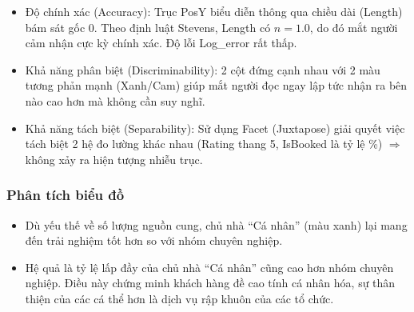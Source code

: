 \begin{itemize}
    \item Độ chính xác (Accuracy): Trục PosY biểu diễn thông qua chiều dài (Length) bám sát gốc 0. Theo định luật Stevens, Length có $n = 1.0$, do đó mắt người cảm nhận cực kỳ chính xác. Độ lỗi Log\_error rất thấp.
    \item Khả năng phân biệt (Discriminability): 2 cột đứng cạnh nhau với 2 màu tương phản mạnh (Xanh/Cam) giúp mắt người đọc ngay lập tức nhận ra bên nào cao hơn mà không cần suy nghĩ.
    \item Khả năng tách biệt (Separability): Sử dụng Facet (Juxtapose) giải quyết việc tách biệt 2 hệ đo lường khác nhau (Rating thang 5, IsBooked là tỷ lệ \%) $\Rightarrow$ không xảy ra hiện tượng nhiễu trục.
\end{itemize}

\subsubsection{Phân tích biểu đồ}

\begin{itemize}
    \item Dù yếu thế về số lượng nguồn cung, chủ nhà ``Cá nhân'' (màu xanh) lại mang đến trải nghiệm tốt hơn so với nhóm chuyên nghiệp.
    \item Hệ quả là tỷ lệ lấp đầy của chủ nhà ``Cá nhân'' cũng cao hơn nhóm chuyên nghiệp. Điều này chứng minh khách hàng đề cao tính cá nhân hóa, sự thân thiện của các cá thể hơn là dịch vụ rập khuôn của các tổ chức.
\end{itemize}
